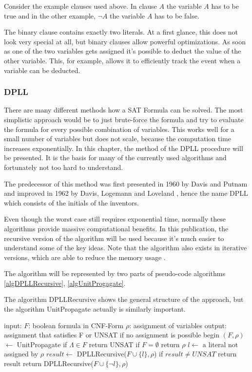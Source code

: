 Consider the example clauses used above. In clause $A$ the variable $A$ has to be true and in the other example, $\lnot A$ the variable $A$ has to be false.

The binary clause contains exactly two literals. At a first glance, this does not look very special at all, but binary clauses allow powerful optimizations. As soon as one of the two variables gets assigned it's possible to deduct the value of the other variable. This, for example, allows it to efficiently track the event when a variable can be deducted.
\subsubsection{DPLL}

There are many different methods how a SAT Formula can be solved. The most simplistic approach would be to just brute-force the formula and try to evaluate the formula for every possible combination of variables. This works well for a small number of variables but does not scale, because the computation time increases exponentially. In this chapter, the method of the DPLL procedure will be presented. It is the basis for many of the currently used algorithms and fortunately not too hard to understand.

The predecessor of this method was first presented in 1960 by Davis and Putnam \cite{Davis:1960:CPQ:321033.321034} and improved in 1962 by Davis, Logemann and Loveland \cite{Davis:1962:MPT:368273.368557}, hence the name DPLL which consists of the initials of the inventors.

Even though the worst case still requires exponential time, normally these algorithms provide massive computational benefits. In this publication, the recursive version of the algorithm will be used because it's much easier to understand some of the key ideas. Note that the algorithm also exists in iterative versions, which are able to reduce the memory usage \cite{Gomes2008SatisfiabilityS}.

The algorithm will be represented by two parts of pseudo-code algorithms \ref{algDPLLRecursive}, \ref{algUnitProgagate}.

The algorithm DPLLRecursive shows the general structure of the approach, but the algorithm UnitPropagate actually is similarly important.

\begin{algorithm}[caption={DPLLRecursive}, label={algDPLLRecursive}]
 input: $F$: boolean formula in CNF-Form
	$\rho$: assignment of variables
 output: assignment that satisfies F or 
	UNSAT if no assignment is possible
 begin
   $(F, \rho)$  $\gets$ UnitPropagate
   if $\Lambda \in F$
       return UNSAT
   if $F = \emptyset$
       return $\rho$
   $l \gets$ a literal not assigned by $\rho$
   $result \gets$ DPLLRecursive($F \cup \{l\}, \rho$)
   if $result \neq UNSAT$
       return result
   return DPLLRecursive($F \cup \{\lnot l\}, \rho$)
\end{algorithm}



